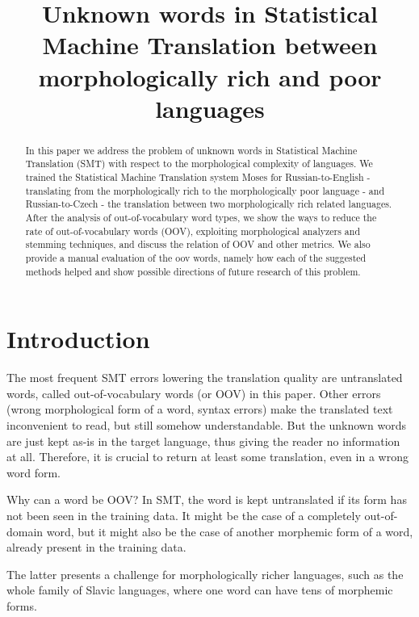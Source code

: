 \documentclass[11pt,letterpaper]{article}
\title{Unknown words in Statistical Machine Translation between morphologically
rich and poor languages}
\date{}
\begin{document}
\maketitle
\begin{abstract}
In this paper we address the problem of unknown words in Statistical
Machine Translation (SMT) with respect to the morphological complexity of languages. 
We trained the Statistical Machine Translation system Moses
for Russian-to-English - translating from the morphologically rich to the
morphologically poor language - and Russian-to-Czech - the translation
between two morphologically rich related languages. After the analysis of
out-of-vocabulary word types, we show the ways to reduce the rate of out-of-vocabulary words (OOV), 
exploiting morphological analyzers
and stemming techniques, and discuss the relation of OOV and other metrics.
We also provide a manual evaluation of the oov words, namely how each of
the suggested methods helped and show possible directions of future research of
this problem.
\end{abstract}

\section{Introduction}
The most frequent SMT errors lowering the translation quality
are untranslated words, called out-of-vocabulary words (or OOV) in this paper. Other errors (wrong morphological form of a word, syntax errors) make the translated text inconvenient to read, but still somehow understandable. But the unknown words are just kept as-is in the target language, thus giving the reader no information at all. Therefore, it is crucial to return at least some translation, even in a wrong word form.

Why can a word be OOV? In SMT, the word is kept untranslated if its form has not been seen in the training data. It might be the case of a completely out-of-domain word, but it might also be the case of another morphemic form of a word, already present in the training data. 

The latter presents a challenge for morphologically richer languages, such as the whole family of Slavic languages, where one word can have tens of morphemic forms.
\end{document}
